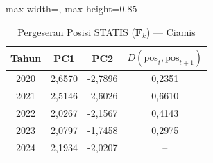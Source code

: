 \begin{table}[H]
\centering
\caption{Pergeseran Posisi STATIS ($\mathbf{F}_k$) --- Ciamis} \label{tab:app2jarak_statis_skor_ciamis}
\begin{adjustbox}{max width=\textwidth, max height=0.85\textheight}
\begin{tabular}{|c|c|c|c|}
\hline
\textbf{Tahun} & \textbf{PC1} & \textbf{PC2} & \textbf{$D(\text{pos}_t, \text{pos}_{t+1})$} \\
\hline
2020 & 2,6570 & -2,7896 & 0,2351 \\
2021 & 2,5146 & -2,6026 & 0,6610 \\
2022 & 2,0267 & -2,1567 & 0,4143 \\
2023 & 2,0797 & -1,7458 & 0,2975 \\
2024 & 2,1934 & -2,0207 & -- \\
\hline
\end{tabular}
\end{adjustbox}
\end{table}